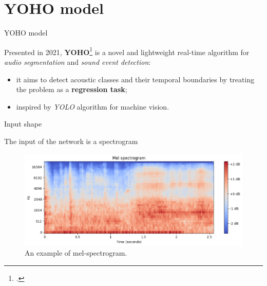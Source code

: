 

\section[YOHO model]{YOHO model}

	\begin{frame}{YOHO model}
			
		Presented in 2021, \textbf{YOHO}\footcite{Venkatesh_2022} is a novel and lightweight real-time algorithm for \textit{audio segmentation} and \textit{sound event detection}:
		\begin{itemize}
			\item it aims to detect acoustic classes and their temporal boundaries by treating the problem as a \textbf{regression task};
			\item inspired by \textit{YOLO} algorithm for machine vision.
		\end{itemize}
		
		\note{
			\dots			
		}		
		
	\end{frame}
	
	\begin{frame}{Input shape}
	
		The input of the network is a spectrogram
		\begin{figure}
			\centering
			\includegraphics[width=.75\textwidth]{images/spectrogram.png}

			\caption{An example of mel-spectrogram.}
			\label{fig:spectogram}
		\end{figure}
	
		
		\note{
			\dots
		}
	\end{frame}
	
